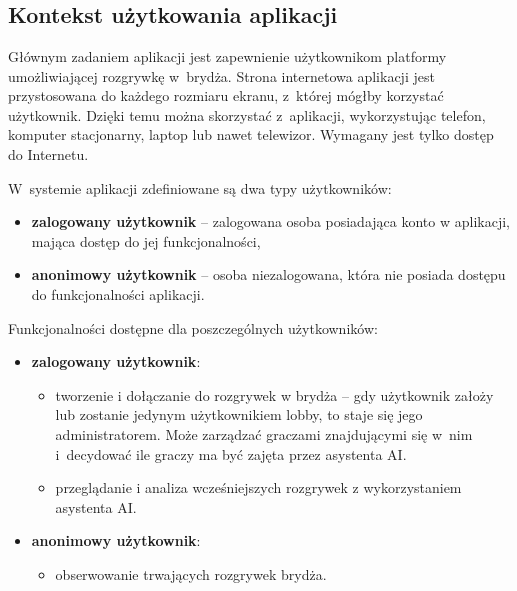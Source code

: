 \chapter{\ChapterTitleScope}
\label{sec:zakres-funkcjonalnosci}


\section{Kontekst użytkowania aplikacji}

Głównym zadaniem aplikacji jest zapewnienie użytkownikom platformy
umożliwiającej rozgrywkę w~brydża. Strona internetowa aplikacji jest
przystosowana do każdego rozmiaru ekranu, z~której mógłby korzystać
użytkownik. Dzięki temu można skorzystać z~aplikacji, wykorzystując
telefon, komputer stacjonarny, laptop lub nawet telewizor. Wymagany
jest tylko dostęp do Internetu.

W~systemie aplikacji zdefiniowane są dwa typy użytkowników:
\begin{itemize}
  \item \textbf{zalogowany użytkownik} -- zalogowana osoba posiadająca konto w aplikacji, mająca dostęp do
        jej funkcjonalności,

  \item \textbf{anonimowy użytkownik} -- osoba niezalogowana, która nie
        posiada dostępu do
        funkcjonalności aplikacji.
\end{itemize}

Funkcjonalności dostępne dla poszczególnych użytkowników:
\begin{itemize}
  \item \textbf{zalogowany użytkownik}:
        \begin{itemize}
          \item tworzenie i dołączanie do rozgrywek w brydża --
                gdy użytkownik założy lub zostanie jedynym
                użytkownikiem lobby, to staje się jego
                administratorem.
                Może zarządzać graczami znajdującymi się w~nim
                i~decydować ile graczy ma być zajęta przez asystenta AI.
          \item przeglądanie i analiza wcześniejszych rozgrywek
                z wykorzystaniem asystenta AI.
        \end{itemize}

  \item \textbf{anonimowy użytkownik}:
        \begin{itemize}
          \item obserwowanie trwających rozgrywek brydża.
        \end{itemize}
\end{itemize}

